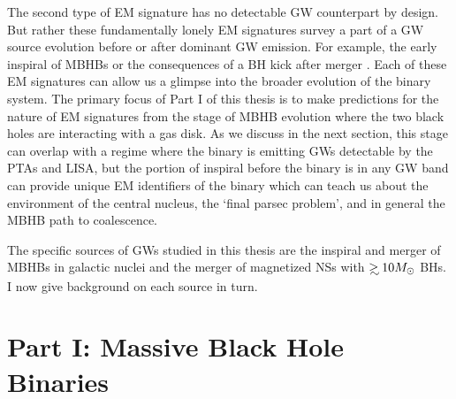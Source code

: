 The second type of EM signature has no detectable GW counterpart by design.
But rather these fundamentally lonely EM signatures survey a part of a GW
source evolution before or after dominant GW emission. For example, the early
inspiral of MBHBs \citep{Haiman+2008, HKM09} or the consequences of a BH kick
after merger \citep{BHkicks}. Each of these EM signatures can allow us a
glimpse into the broader evolution of the binary system. The primary focus of
Part I of this thesis is to make predictions for the nature of EM signatures
from the stage of MBHB evolution where the two black holes are interacting
with a gas disk. As we discuss in the next section, this stage can overlap
with a regime where the binary is emitting GWs detectable by the PTAs and
LISA, but the portion of inspiral before the binary is in any GW band
can provide unique EM identifiers of the binary which can teach us about the
environment of the central nucleus, the `final parsec problem', and in general
the MBHB path to coalescence.





 



The specific sources of GWs studied in this thesis are the inspiral and merger
of MBHBs in galactic nuclei and the merger of magnetized NSs with $\gsim 10
\Msun$ BHs. I now give background on each source in turn.

\section{Part I: Massive Black Hole Binaries} %
